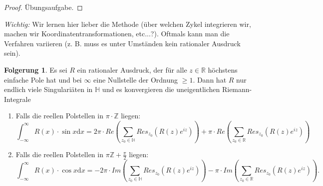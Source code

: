 \documentclass[11pt,titlepage]{article}
\theoremstyle{definition}
\newtheorem{corollary}[theorem]{Folgerung}
\theoremstyle{remark}
\begin{document}
	\begin{proof}
		Übungsaufgabe.
	\end{proof}
	
	\textsl{Wichtig:} Wir lernen hier lieber die Methode (über welchen Zykel integrieren wir, machen wir 
	Koordinatentransformationen, etc...?). Oftmals kann man die Verfahren variieren (z. B. muss es unter 
	Umständen kein rationaler Ausdruck sein).
	
	\begin{corollary}
		Es sei $R$ ein rationaler Ausdruck, der für alle $z\in \mathbb{R}$ höchstens einfache Pole hat und bei 
		$\infty$ eine Nullstelle der Ordnung $\geq 1$. Dann hat $R$ nur endlich viele Singulariäten in 
		$\mathbb{H}$ und es konvergieren die uneigentlichen Riemann-Integrale
		\begin{enumerate}
			\item Falls die reellen Polstellen in $\pi\cdot\mathbb{Z}$ liegen:
			\[ \int_{-\infty}^{\infty} R(x)\cdot \sin x\mathrm{d}x =2\pi \cdot Re\left(\sum_{z_0 \in\mathbb{H}}
			Res_{z_0}\left(R(z)e^{iz}\right)\right) + \pi \cdot Re\left(\sum_{z_0 \in\mathbb{R}}
			Res_{z_0}\left(R(z)e^{iz}\right)\right) \]
			
			\item Falls die reellen Polstellen in $\pi \mathbb{Z}+\frac{\pi}{2}$ liegen:
			\[ \int_{-\infty}^{\infty} R(x)\cdot \cos x \mathrm{d}x =-2\pi\cdot Im\left(\sum_{z_0 \in\mathbb{H}}
			Res_{z_0}\left(R(z)e^{iz}\right)\right) - \pi \cdot Im\left(\sum_{z_0 \in\mathbb{R}}
			Res_{z_0}\left(R(z)e^{iz}\right)\right). \]
		\end{enumerate}
	\end{corollary}
	
\end{document}
